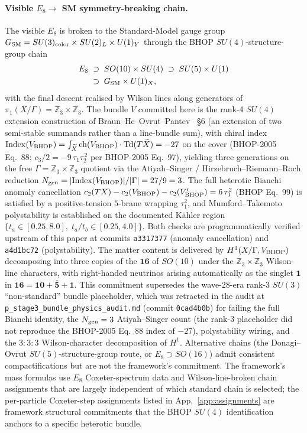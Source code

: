 ﻿\documentclass[reprint,amsmath,amssymb,aps,prd,longbibliography,floatfix]{revtex4-2}
\begin{document}
\paragraph{Visible $E_8 \to$ SM symmetry-breaking chain.}
The visible $E_8$ is broken to the Standard-Model gauge group
$G_{\rm SM} = SU(3)_{\rm color} \times SU(2)_L \times U(1)_Y$
through the BHOP $SU(4)$-structure-group chain
\begin{equation}
\begin{aligned}
E_8 \;&\supset\; SO(10) \times SU(4) \;\supset\; SU(5) \times U(1) \\
    \;&\supset\; G_{\rm SM} \times U(1)_X,
\end{aligned}
\end{equation}
with the final descent realised by Wilson lines along generators
of $\pi_1(X/\Gamma) = \mathbb{Z}_3 \times \mathbb{Z}_3$. The bundle
$V$ committed here is the rank-4 $SU(4)$ extension construction of
Braun--He--Ovrut--Pantev~\cite{BHOPVectorBundle2006} \S 6 (an
extension of two semi-stable summands rather than a line-bundle
sum), with chiral index
$\mathrm{Index}(V_{\rm BHOP}) = \int_{\widetilde X} \mathrm{ch}(V_{\rm BHOP})
\cdot \mathrm{Td}(T\widetilde X) = -27$ on the cover (BHOP-2005 Eq.~88;
$c_3 / 2 = -9\,\tau_1\tau_2^{\,2}$ per BHOP-2005 Eq.~97), yielding
three generations on the free $\Gamma = \mathbb{Z}_3 \times \mathbb{Z}_3$
quotient via the Atiyah--Singer / Hirzebruch--Riemann--Roch reduction
$N_{\rm gen} = |\mathrm{Index}(V_{\rm BHOP})| / |\Gamma| = 27/9 = 3$.
The full heterotic
Bianchi anomaly cancellation
$c_2(TX) - c_2(V_{\rm BHOP}) - c_2(V'_{\rm BHOP}) = 6\,\tau_1^2$
(BHOP Eq.~99) is satisfied by a positive-tension $5$-brane wrapping
$\tau_1^2$, and Mumford--Takemoto polystability is established on
the documented K\"ahler region
$\{t_a \in [0.25, 8.0],\; t_a/t_b \in [0.25, 4.0]\}$. Both checks
are programmatically verified upstream of this paper at commits
\texttt{a3317377} (anomaly cancellation) and \texttt{a4d1bc72}
(polystability). The matter content is delivered by $H^1(X/\Gamma,
V_{\rm BHOP})$ decomposing into three copies of the $\mathbf{16}$
of $SO(10)$ under the $\mathbb{Z}_3 \times \mathbb{Z}_3$ Wilson-line
characters, with right-handed neutrinos arising automatically as
the singlet $\mathbf{1}$ in $\mathbf{16} = \mathbf{10} +
\bar{\mathbf{5}} + \mathbf{1}$. This commitment supersedes the
wave-28-era rank-3 $SU(3)$ ``non-standard'' bundle placeholder,
which was retracted in the audit at
\texttt{p\_stage3\_bundle\_physics\_audit.md} (commit
\texttt{0cad4b0b}) for failing the full Bianchi identity, the
$N_{\rm gen} = 3$ Atiyah--Singer count (the rank-3 placeholder
did not reproduce the BHOP-2005 Eq.~88 index of $-27$), polystability
wiring, and the
$3{:}3{:}3$ Wilson-character decomposition of $H^1$. Alternative
chains (the Donagi--Ovrut $SU(5)$-structure-group route, or
$E_8 \supset SO(16)$) admit consistent compactifications but are
not the framework's commitment. The framework's mass formulas use
$E_8$ Coxeter-spectrum data and Wilson-line-broken chain
assignments that are largely independent of which standard chain
is selected; the per-particle Coxeter-step assignments listed in
App.~\ref{app:assignments} are framework structural commitments
that the BHOP $SU(4)$ identification anchors to a specific
heterotic bundle.
\end{document}
